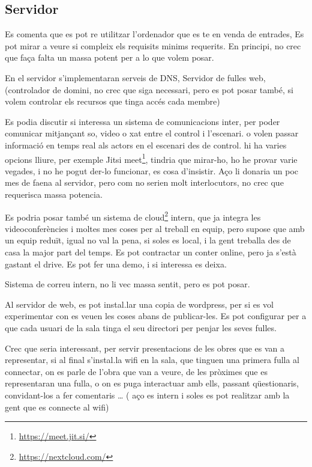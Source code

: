 \documentclass[
  10pt,
]{krantz}
\DeclareRobustCommand{\href}[2]{#2\footnote{\url{#1}}}
\begin{document}
\hypertarget{servidor}{%
\subsection{Servidor}\label{servidor}}

Es comenta que es pot re utilitzar l'ordenador que es te en venda de entrades, Es pot mirar a veure si compleix els requisits minims requerits. En principi, no crec que faça falta un massa potent per a lo que volem posar.

En el servidor s'implementaran serveis de DNS, Servidor de fulles web, (controlador de domini, no crec que siga necessari, pero es pot posar també, si volem controlar els recursos que tinga accés cada membre)

Es podia discutir si interessa un sistema de comunicacions inter, per poder comunicar mitjançant so, video o xat entre el control i l'escenari. o volen passar informació en temps real als actors en el escenari des de control. hi ha varies opcions lliure, per exemple \href{https://meet.jit.si/}{Jitsi meet}, tindria que mirar-ho, ho he provar varie vegades, i no he pogut der-lo funcionar, es cosa d'insistir. Aço li donaria un poc mes de faena al servidor, pero com no serien molt interlocutors, no crec que requerisca massa potencia.

Es podria posar també un sistema de \href{https://nextcloud.com/}{cloud} intern, que ja integra les videoconferències i moltes mes coses per al treball en equip, pero supose que amb un equip reduït, igual no val la pena, si soles es local, i la gent treballa des de casa la major part del temps. Es pot contractar un conter online, pero ja s'està gastant el drive. Es pot fer una demo, i si interessa es deixa.

Sistema de correu intern, no li vec massa sentit, pero es pot posar.

Al servidor de web, es pot instal.lar una copia de wordpress, per si es vol experimentar con es veuen les coses abans de publicar-les. Es pot configurar per a que cada usuari de la sala tinga el seu directori per penjar les seves fulles.

Crec que seria interessant, per servir presentacions de les obres que es van a representar, si al final s'instal.la wifi en la sala, que tinguen una primera fulla al connectar, on es parle de l'obra que van a veure, de les pròximes que es representaran una fulla, o on es puga interactuar amb ells, passant qüestionaris, convidant-los a fer comentaris \ldots{} ( aço es intern i soles es pot realitzar amb la gent que es connecte al wifi)
\end{document}
